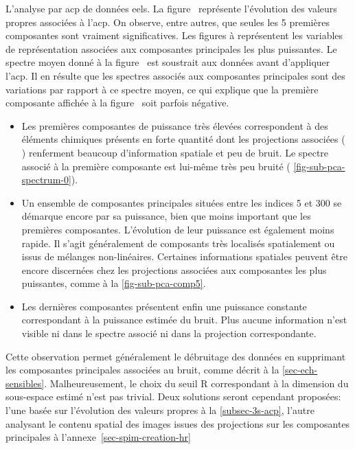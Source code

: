 \begin{normalfigure*}[htbp]
{            \label{fig-sub-pca-spectrum-0}}
        \caption{L'analyse par \gls{acp} de données \gls{eels}. La figure~ représente l'évolution des valeurs propres associées à l'\gls{acp}. On observe, entre autres, que seules les 5 premières composantes sont vraiment significatives. Les figures  à  représentent les variables de représentation associées aux composantes principales les plus puissantes. Le spectre moyen donné à la figure~ est soustrait aux données avant d'appliquer l'\gls{acp}. Il en résulte que les spectres associés aux composantes principales sont des variations par rapport à ce spectre moyen, ce qui explique que la première composante affichée à la figure~ soit parfois négative.
            \protect\label{fig-ACP}}
    \end{normalfigure*}    
    \begin{itemize}
        \item Les premières composantes de puissance très élevées correspondent à des éléments chimiques présents en forte quantité dont les projections associées (\cf{} ) renferment beaucoup d'information spatiale et peu de bruit. Le spectre associé à la première composante est lui-même très peu bruité (\cf{} \cref{fig-sub-pca-spectrum-0}).
        \item Un ensemble de composantes principales situées entre les indices 5 et 300 se démarque encore par sa puissance, bien que moins important que les premières composantes. L'évolution de leur puissance est également moins rapide. Il s'agit généralement de composants très localisés spatialement ou issus de mélanges non-linéaires. Certaines informations spatiales peuvent être encore discernées chez les projections associées aux composantes les plus puissantes, comme à la \cref{fig-sub-pca-comp5}.
        \item Les dernières composantes présentent enfin une puissance constante correspondant à la puissance estimée du bruit. Plus aucune information n'est visible ni dans le spectre associé ni dans la projection correspondante.
    \end{itemize}
    Cette observation permet généralement le débruitage des données en supprimant les composantes principales associées au bruit, comme décrit à la \cref{sec-ech-sensibles}. Malheureusement, le choix du seuil \gls{R} correspondant à la dimension du sous-espace estimé n'est pas trivial. Deux solutions seront cependant proposées: l'une basée sur l'évolution des valeurs propres à la \cref{subsec-3s-acp}, l'autre analysant le contenu spatial des images issues des projections sur les composantes principales à l'annexe~\ref{sec-spim-creation-hr}


